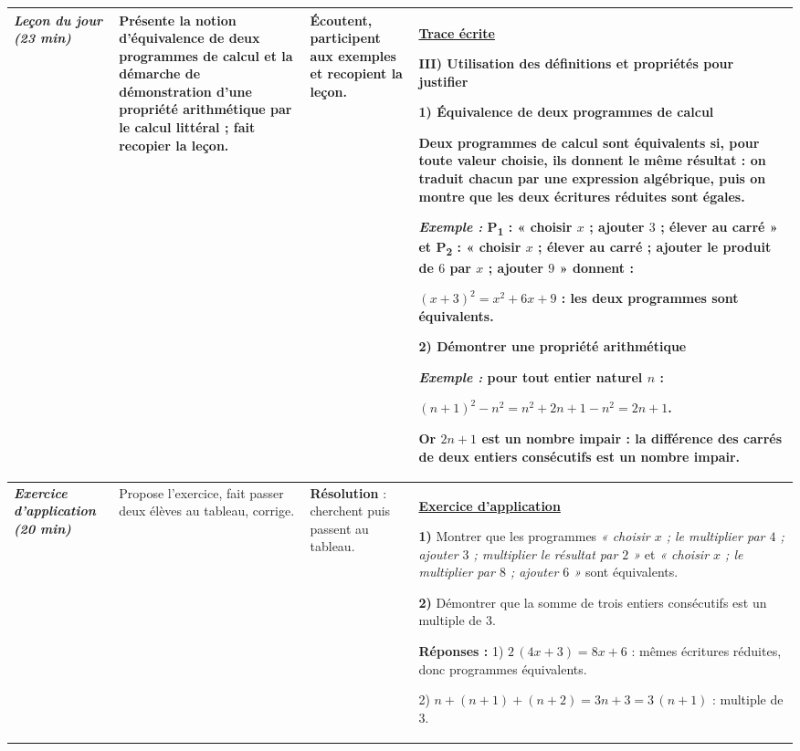 \documentclass[10pt]{article}
\newcommand{\titreR}[1]{\underline{\textcolor{rougetitre}{\bfseries #1}}}
\newcommand{\app}{\titreR{Exercice d'application}}
\newcommand{\moment}[1]{\textbf{\itshape #1}}
\newcommand{\mclef}[1]{\colorbox{jaunesurl}{#1}}
\begin{document}
\begin{longtable}{|p{2.35cm}|p{5.35cm}|p{4.55cm}|p{13.85cm}|}
\moment{Leçon du jour (23 min)} &
Présente la notion d'équivalence de deux programmes de calcul et la démarche de
démonstration d'une propriété arithmétique par le calcul littéral ; fait recopier
la leçon. &
Écoutent, participent aux exemples et recopient la leçon. &
\titreR{Trace écrite} \par
\textbf{III) Utilisation des définitions et propriétés pour justifier} \par
\textbf{1) Équivalence de deux programmes de calcul} \par
Deux programmes de calcul sont \mclef{équivalents} si, pour toute valeur choisie,
ils donnent le même résultat : on traduit chacun par une expression algébrique, puis
on montre que les deux écritures réduites sont égales. \par
\textit{Exemple :} P\textsubscript{1} : « choisir $x$ ; ajouter $3$ ; élever au
carré » et P\textsubscript{2} : « choisir $x$ ; élever au carré ; ajouter le produit
de $6$ par $x$ ; ajouter $9$ » donnent : \par
$(x+3)^2=x^2+6x+9$ : les deux programmes sont équivalents. \par
\textbf{2) Démontrer une propriété arithmétique} \par
\textit{Exemple :} pour tout entier naturel $n$ : \par
$(n+1)^2-n^2=n^2+2n+1-n^2=2n+1$. \par
Or $2n+1$ est un nombre impair : \textbf{la différence des carrés de deux entiers
consécutifs est un nombre impair}. \\ \hline

\moment{Exercice d'application (20 min)} &
Propose l'exercice, fait passer deux élèves au tableau, corrige. &
\textbf{Résolution} : cherchent puis passent au tableau. &
\app \par
\textbf{1)} Montrer que les programmes \textit{« choisir $x$ ; le multiplier par $4$ ;
ajouter $3$ ; multiplier le résultat par $2$ »} et \textit{« choisir $x$ ; le
multiplier par $8$ ; ajouter $6$ »} sont équivalents. \par
\textbf{2)} Démontrer que la somme de trois entiers consécutifs est un multiple de $3$. \par
\textbf{Réponses :} 1) $2\,(4x+3)=8x+6$ : mêmes écritures réduites, donc programmes
équivalents. \par
2) $n+(n+1)+(n+2)=3n+3=3\,(n+1)$ : multiple de $3$. \\ \hline


\end{longtable}
\end{document}
